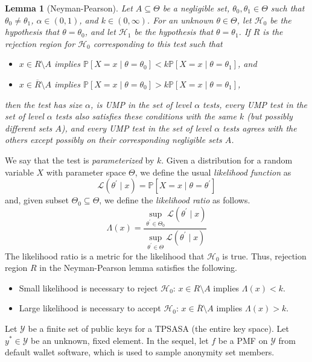 \documentclass{tran-l}
\newtheorem{lemma}[theorem]{Lemma}
\theoremstyle{cor}
\theoremstyle{definition}
\theoremstyle{remark}
\theoremstyle{conjecture}
\numberwithin{equation}{section}
\begin{document}
\begin{lemma}[Neyman-Pearson]
Let $A \subseteq \Theta$ be a negligible set, $\theta_0, \theta_1 \in \Theta$ such that $\theta_0 \neq \theta_1$, $\alpha \in (0, 1)$, and $k \in (0, \infty)$.
For an unknown $\theta \in \Theta$, let $\mathcal{H}_0$ be the hypothesis that $\theta = \theta_0$, and let $\mathcal{H}_1$ be the hypothesis that $\theta = \theta_1$.
If $R$ is the rejection region for $\mathcal{H}_0$ corresponding to this test such that
\begin{itemize}
\item $x \in R \setminus A$ implies $\mathbb{P}[X=x \mid \theta = \theta_0] < k\mathbb{P}[X=x \mid \theta = \theta_1]$, and
\item $x \in \overline{R} \setminus A$ implies $\mathbb{P}[X=x \mid \theta = \theta_0] > k\mathbb{P}[X=x \mid \theta = \theta_1]$,
\end{itemize}
then the test has size $\alpha$, is UMP in the set of level $\alpha$ tests, every UMP test in the set of level $\alpha$ tests also satisfies these conditions with the same $k$ (but possibly different sets $A$), and every UMP test in the set of level $\alpha$ tests agrees with the others except possibly on their corresponding negligible sets $A$.
\end{lemma}


We say that the test is \textit{parameterized} by $k$.
Given a distribution for a random variable $X$ with parameter space $\Theta$, we define the usual \textit{likelihood function} as \[\mathcal{L}(\theta^\prime \mid x) = \mathbb{P}\left[X=x \mid \theta = \theta^\prime\right]\]
and, given subset $\Theta_0 \subseteq \Theta$, we  define the \textit{likelihood ratio} as follows. \[\Lambda(x) = \frac{\sup_{\theta^\prime \in \Theta_0} \mathcal{L}(\theta^\prime \mid x)}{\sup_{\theta^\prime \in \Theta} \mathcal{L}(\theta^\prime \mid x)}\]
The likelihood ratio is a metric for the likelihood that $\mathcal{H}_0$ is true. Thus, rejection region $R$ in the Neyman-Pearson lemma satisfies the following.
\begin{itemize}
\item Small likelihood is necessary to reject $\mathcal{H}_0$: $x \in R \setminus A$ implies $\Lambda(x) < k$.
\item Large likelihood is necessary to accept $\mathcal{H}_0$: $x \in \overline{R} \setminus A$ implies $\Lambda(x) > k$.
\end{itemize}


Let $\mathcal{Y}$ be a finite set of public keys for a TPSASA (the entire key space).
Let $y^* \in \mathcal{Y}$ be an unknown, fixed element.
In the sequel, let $f$ be a PMF on $\mathcal{Y}$ from default wallet software, which is used to sample anonymity set members.
\end{document}
